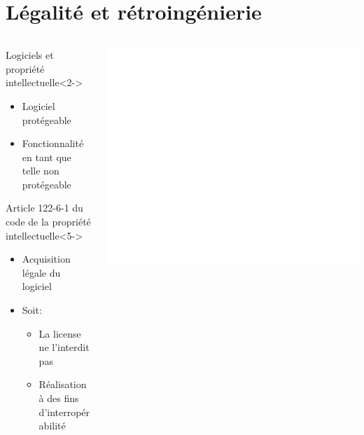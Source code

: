 \documentclass[aspectratio=1610]{beamer}%
\begin{document}
  \section{Légalité et rétroingénierie}
  \begin{frame}[t]
    \slidetitle[]%
    \begin{columns}
      \begin{column}{0.7\linewidth}
        \begin{block}{Logiciels et propriété intellectuelle}<2->
          \begin{itemize}
          \item<3-> Logiciel protégeable
          \item<4-> Fonctionnalité en tant que telle non protégeable
          \end{itemize}
        \end{block}
        \begin{block}{Article 122-6-1 du code de la propriété intellectuelle}<5->
          \begin{itemize}
          \item<6-> Acquisition légale du logiciel
          \item<7-> Soit:
          \begin{itemize}
          \item<8-> La license ne l'interdit pas
          \item<9-> Réalisation à des fins d'interropérabilité
          \end{itemize} 
          \end{itemize}
        \end{block}
      \end{column}
      \begin{column}{0.25\linewidth}
        \includegraphics[width=0.95\linewidth]{img/justice.png}

\end{column}
\end{columns}
\end{frame}
\end{document}
